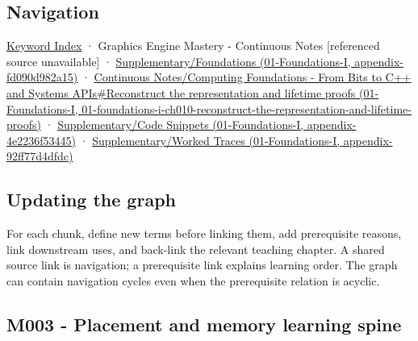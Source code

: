 \subsection{Navigation}\label{appendix-4ad47bdd269a-navigation}

\hyperref[appendix-a6d556a4ef50]{Keyword Index} · {Graphics Engine Mastery - Continuous Notes {[}referenced source unavailable{]}} · \href{../01-Foundations-I/main.pdf\#nameddest=appendix-fd090d982a15}{Supplementary/Foundations (01-Foundations-I, appendix-fd090d982a15)} · \href{../01-Foundations-I/main.pdf\#nameddest=01-foundations-i-ch010-reconstruct-the-representation-and-lifetime-proofs}{Continuous Notes/Computing Foundations - From Bits to C++ and Systems APIs\#Reconstruct the representation and lifetime proofs (01-Foundations-I, 01-foundations-i-ch010-reconstruct-the-representation-and-lifetime-proofs)} · \href{../01-Foundations-I/main.pdf\#nameddest=appendix-4e2236f53445}{Supplementary/Code Snippets (01-Foundations-I, appendix-4e2236f53445)} · \href{../01-Foundations-I/main.pdf\#nameddest=appendix-92ff77d4dfdc}{Supplementary/Worked Traces (01-Foundations-I, appendix-92ff77d4dfdc)}

\subsection{Updating the graph}\label{appendix-4ad47bdd269a-updating-the-graph}

For each chunk, define new terms before linking them, add prerequisite reasons, link downstream uses, and back-link the relevant teaching chapter. A shared source link is navigation; a prerequisite link explains learning order. The graph can contain navigation cycles even when the prerequisite relation is acyclic.

\subsection{M003 - Placement and memory learning spine}\label{appendix-4ad47bdd269a-m003---placement-and-memory-learning-spine}

